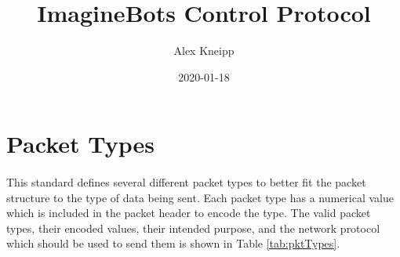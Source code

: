 \documentclass[11pt]{article}
\begin{document}

\title{ImagineBots Control Protocol}
\author{Alex Kneipp}
\date{2020-01-18}
\maketitle

\hspace{1in}

\tableofcontents


\newpage
\section {Packet Types}
\paragraph{}
This standard defines several different packet types to better fit the packet structure to the type of data being sent.
Each packet type has a numerical value which is included in the packet header to encode the type.
The valid packet types, their encoded values, their intended purpose, 
and the network protocol which should be used to send them is shown in Table \ref{tab:pktTypes}.
\end{document}
